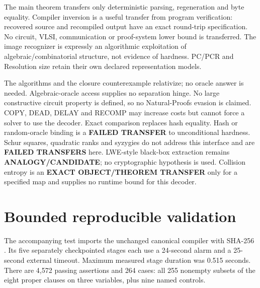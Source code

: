 \documentclass[11pt]{article}
\begin{document}
The main theorem transfers only deterministic parsing, regeneration and
byte equality. Compiler inversion is a useful transfer from program
verification: recovered source and recompiled output have an exact round-trip
specification. No circuit, VLSI, communication or proof-system lower bound
is transferred. The image recognizer is expressly an algorithmic exploitation
of algebraic/combinatorial structure, not evidence of hardness. PC/PCR and
Resolution size retain their own declared representation models.

The algorithms and the closure counterexample relativize; no oracle answer
is needed. Algebraic-oracle access supplies no separation hinge. No large
constructive circuit property is defined, so no Natural-Proofs evasion is
claimed. COPY, DEAD, DELAY and RECOMP may increase costs but cannot force a
solver to use the decoder. Exact comparison replaces hash equality. Hash or
random-oracle binding is a \textbf{FAILED TRANSFER} to unconditional hardness.
Schur squares, quadratic ranks and syzygies do not address this interface and
are \textbf{FAILED TRANSFERS} here. LWE-style black-box extraction remains
\textbf{ANALOGY/CANDIDATE}; no cryptographic hypothesis is used. Collision
entropy is an \textbf{EXACT OBJECT/THEOREM TRANSFER} only for a specified map
and supplies no runtime bound for this decoder.

\section{Bounded reproducible validation}
The accompanying test imports the unchanged canonical compiler with SHA-256
.
Its five separately checkpointed stages each use a 24-second alarm and a
25-second external timeout. Maximum measured stage duration was 0.515 seconds.
There are 4,572 passing assertions and 264 cases: all 255 nonempty subsets of
the eight proper clauses on three variables, plus nine named controls.
\end{document}
